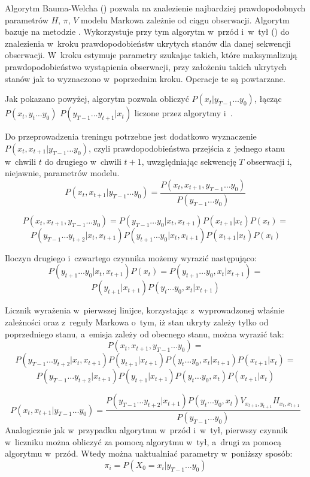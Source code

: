 Algorytm Bauma-Welcha () pozwala na znalezienie najbardziej prawdopodobnych parametrów
$H$, $\pi$, $V$ modelu Markowa zależnie od ciągu obserwacji. Algorytm bazuje na metodzie
. Wykorzystuje przy tym algorytm w~przód i~w~tył ()
do znalezienia w~kroku  prawdopodobieństw ukrytych stanów dla danej sekwencji obserwacji.
W~kroku  estymuje parametry szukając takich, które maksymalizują prawdopodobieństwo wystąpienia
obserwacji, przy założeniu takich ukrytych stanów jak to wyznaczono w~poprzednim kroku. Operacje te są powtarzane.

Jak pokazano powyżej, algorytm  pozwala obliczyć $P(x_t | y_{T-1} \dots y_0)$,
łącząc $P(x_t, y_t \dots y_0)$ $P(y_{T-1} \dots y_{t+1} | x_t)$ liczone przez algorytmy  i~.

Do przeprowadzenia treningu  potrzebne jest dodatkowo wyznaczenie $P(x_t, x_{t+1} | y_{T-1} \dots y_0)$,
czyli prawdopodobieństwa przejścia z~jednego stanu w~chwili $t$ do drugiego w~chwili $t + 1$,
uwzględniając sekwencję $T$ obserwacji i, niejawnie, parametrów modelu.
$$P(x_t, x_{t+1} | y_{T-1} \dots y_0)
= \frac{P(x_t, x_{t+1}, y_{T-1} \dots y_0)}{P(y_{T-1} \dots y_0)}$$

$$P(x_t, x_{t+1}, y_{T-1} \dots y_0) = P(y_{T-1} \dots y_0 | x_t, x_{t+1}) P(x_{t+1} | x_t) P(x_t) = $$
$$P(y_{T-1} \dots y_{t+2} | x_t, x_{t+1}) P(y_{t+1} \dots y_0 | x_t, x_{t+1}) P(x_{t+1} | x_t) P(x_t)$$

Iloczyn drugiego i~czwartego czynnika możemy wyrazić następująco:
$$P(y_{t+1} \dots y_0 | x_t, x_{t+1}) P(x_t) = P(y_{t+1} \dots y_0, x_t | x_{t+1}) = $$
$$P(y_{t+1} | x_{t+1}) P(y_t \dots y_0, x_t | x_{t+1})$$

Licznik wyrażenia w~pierwszej linijce, korzystając z~wyprowadzonej właśnie zależności oraz z~reguły Markowa o~tym,
iż stan ukryty zależy tylko od poprzedniego stanu, a~emisja zależy od obecnego stanu, można wyrazić tak:
$$P(x_t, x_{t+1}, y_{T-1} \dots y_0) =$$
$$P(y_{T-1} \dots y_{t+2} | x_t, x_{t+1}) P(y_{t+1} | x_{t+1}) P(y_t \dots y_0, x_t | x_{t+1}) P(x_{t+1} | x_t) =$$
$$P(y_{T-1} \dots y_{t+2} | x_{t+1}) P(y_{t+1} | x_{t+1}) P(y_t \dots y_0, x_t) P(x_{t+1} | x_t)$$

$$P(x_t, x_{t+1} | y_{T-1} \dots y_0)
= \frac{P(y_{T-1} \dots y_{t+2} | x_{t+1}) P(y_t \dots y_0, x_t) V_{x_{t+1}, y_{t+1}} H_{x_t, x_{t+1}}}{P(y_{T-1} \dots y_0)}$$
Analogicznie jak w~przypadku algorytmu w~przód i~w~tył, pierwszy czynnik w~liczniku można obliczyć za pomocą
algorytmu w~tył, a~drugi za pomocą algorytmu w~przód. Wtedy można uaktualniać parametry w~poniższy sposób:
$$\pi_i = P(X_0 = x_i | y_{T-1} \dots y_0)$$

